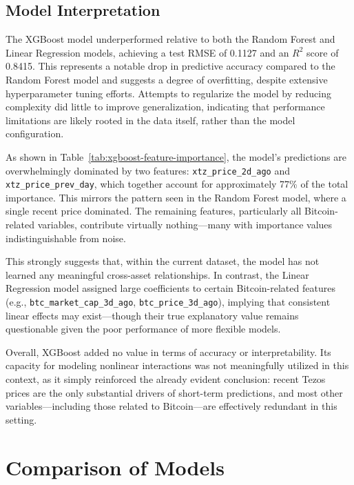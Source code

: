\subsection{Model Interpretation}
\label{sec:xgboost-interpretation}

The XGBoost model underperformed relative to both the Random Forest and Linear Regression models, achieving a test RMSE of 0.1127 and an $R^2$ score of 0.8415. This represents a notable drop in predictive accuracy compared to the Random Forest model and suggests a degree of overfitting, despite extensive hyperparameter tuning efforts. Attempts to regularize the model by reducing complexity did little to improve generalization, indicating that performance limitations are likely rooted in the data itself, rather than the model configuration.

As shown in Table~\ref{tab:xgboost-feature-importance}, the model’s predictions are overwhelmingly dominated by two features: \texttt{xtz\_price\_2d\_ago} and \texttt{xtz\_price\_prev\_day}, which together account for approximately 77\% of the total importance. This mirrors the pattern seen in the Random Forest model, where a single recent price dominated. The remaining features, particularly all Bitcoin-related variables, contribute virtually nothing—many with importance values indistinguishable from noise.

This strongly suggests that, within the current dataset, the model has not learned any meaningful cross-asset relationships. In contrast, the Linear Regression model assigned large coefficients to certain Bitcoin-related features (e.g., \texttt{btc\_market\_cap\_3d\_ago}, \texttt{btc\_price\_3d\_ago}), implying that consistent linear effects may exist—though their true explanatory value remains questionable given the poor performance of more flexible models.

Overall, XGBoost added no value in terms of accuracy or interpretability. Its capacity for modeling nonlinear interactions was not meaningfully utilized in this context, as it simply reinforced the already evident conclusion: recent Tezos prices are the only substantial drivers of short-term predictions, and most other variables—including those related to Bitcoin—are effectively redundant in this setting.

\section{Comparison of Models}
\label{sec:comparison}

